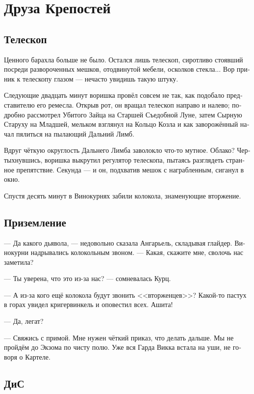 \documentclass[a4paper,12pt,fleqn]{book}\usepackage{cooltooltips}\usepackage{polyglossia}\setdefaultlanguage[babelshorthands=true]{russian}\setotherlanguage{english}\defaultfontfeatures{Ligatures=TeX,Mapping=tex-text} \usepackage{xcolor}\definecolor{lightgray}{HTML}{bbbbbb}\color{lightgray}\newcommand{\ml}[3]{\textenglish{\textcolor{black}{#3}}}
\begin{document}
\chapter{Друза Крепостей}

\section{Телескоп}

Ценного барахла больше не было.
Остался лишь телескоп, сиротливо стоявший посреди развороченных мешков, отодвинутой мебели, осколков стекла...
Вор приник к телескопу глазом --- нечасто увидишь такую штуку.

Следующие двадцать минут воришка провёл совсем не так, как подобало представителю его ремесла.
Открыв рот, он вращал телескоп направо и налево;
подробно рассмотрел Убитого Зайца на Старшей Съедобной Луне, затем Сырную Старуху на Младшей, мельком взглянул на Кольцо Козла и как заворожённый начал пялиться на пылающий Дальний Лимб.

Вдруг чёткую округлость Дальнего Лимба заволокло что-то мутное.
Облако?
Чертыхнувшись, воришка выкрутил регулятор телескопа, пытаясь разглядеть странное препятствие.
Секунда --- и он, подхватив мешок с награбленным, сиганул в окно.

Спустя десять минут в Винокурнях забили колокола, знаменующие вторжение.

\section{Приземление}

--- Да какого дьявола, --- недовольно сказала Ангарьель, складывая глайдер.
Винокурни надрывались колокольным звоном.
--- Какая, скажите мне, сволочь нас заметила?

--- Ты уверена, что это из-за нас? --- сомневалась Курц.

--- А из-за кого ещё колокола будут звонить <<вторженцев>>?
Какой-то пастух в горах увидел кригервинкель и оповестил всех.
Ашита!

--- Да, легат?

--- Свяжись с примой.
Мне нужен чёткий приказ, что делать дальше.
Мы не пройдём до Экзома по чисту полю.
Уже вся Гарда Викка встала на уши, не говоря о Картеле.

\section{ДиС}
\end{document}
